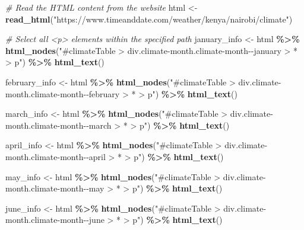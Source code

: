 \documentclass[
]{article}
\newenvironment{Shaded}{\begin{snugshade}}{\end{snugshade}}
\newcommand{\CommentTok}[1]{\textcolor[rgb]{0.56,0.35,0.01}{\textit{#1}}}
\newcommand{\FunctionTok}[1]{\textcolor[rgb]{0.13,0.29,0.53}{\textbf{#1}}}
\newcommand{\NormalTok}[1]{#1}
\newcommand{\OtherTok}[1]{\textcolor[rgb]{0.56,0.35,0.01}{#1}}
\newcommand{\SpecialCharTok}[1]{\textcolor[rgb]{0.81,0.36,0.00}{\textbf{#1}}}
\newcommand{\StringTok}[1]{\textcolor[rgb]{0.31,0.60,0.02}{#1}}
\begin{document}
\begin{Shaded}
\begin{Highlighting}[]
\CommentTok{\# Read the HTML content from the website}
\NormalTok{html }\OtherTok{\textless{}{-}} \FunctionTok{read\_html}\NormalTok{(}\StringTok{"https://www.timeanddate.com/weather/kenya/nairobi/climate"}\NormalTok{)}

\CommentTok{\# Select all \textless{}p\textgreater{} elements within the specified path}
\NormalTok{january\_info }\OtherTok{\textless{}{-}}\NormalTok{ html }\SpecialCharTok{\%\textgreater{}\%}
  \FunctionTok{html\_nodes}\NormalTok{(}\StringTok{"\#climateTable \textgreater{} div.climate{-}month.climate{-}month{-}{-}january \textgreater{} * \textgreater{} p"}\NormalTok{) }\SpecialCharTok{\%\textgreater{}\%}
  \FunctionTok{html\_text}\NormalTok{()}

\NormalTok{february\_info }\OtherTok{\textless{}{-}}\NormalTok{ html }\SpecialCharTok{\%\textgreater{}\%}
  \FunctionTok{html\_nodes}\NormalTok{(}\StringTok{"\#climateTable \textgreater{} div.climate{-}month.climate{-}month{-}{-}february \textgreater{} * \textgreater{} p"}\NormalTok{) }\SpecialCharTok{\%\textgreater{}\%}
  \FunctionTok{html\_text}\NormalTok{()}

\NormalTok{march\_info }\OtherTok{\textless{}{-}}\NormalTok{ html }\SpecialCharTok{\%\textgreater{}\%}
  \FunctionTok{html\_nodes}\NormalTok{(}\StringTok{"\#climateTable \textgreater{} div.climate{-}month.climate{-}month{-}{-}march \textgreater{} * \textgreater{} p"}\NormalTok{) }\SpecialCharTok{\%\textgreater{}\%}
  \FunctionTok{html\_text}\NormalTok{()}

\NormalTok{april\_info }\OtherTok{\textless{}{-}}\NormalTok{ html }\SpecialCharTok{\%\textgreater{}\%}
  \FunctionTok{html\_nodes}\NormalTok{(}\StringTok{"\#climateTable \textgreater{} div.climate{-}month.climate{-}month{-}{-}april \textgreater{} * \textgreater{} p"}\NormalTok{) }\SpecialCharTok{\%\textgreater{}\%}
  \FunctionTok{html\_text}\NormalTok{()}

\NormalTok{may\_info }\OtherTok{\textless{}{-}}\NormalTok{ html }\SpecialCharTok{\%\textgreater{}\%}
  \FunctionTok{html\_nodes}\NormalTok{(}\StringTok{"\#climateTable \textgreater{} div.climate{-}month.climate{-}month{-}{-}may \textgreater{} * \textgreater{} p"}\NormalTok{) }\SpecialCharTok{\%\textgreater{}\%}
  \FunctionTok{html\_text}\NormalTok{()}

\NormalTok{june\_info }\OtherTok{\textless{}{-}}\NormalTok{ html }\SpecialCharTok{\%\textgreater{}\%}
  \FunctionTok{html\_nodes}\NormalTok{(}\StringTok{"\#climateTable \textgreater{} div.climate{-}month.climate{-}month{-}{-}june \textgreater{} * \textgreater{} p"}\NormalTok{) }\SpecialCharTok{\%\textgreater{}\%}
  \FunctionTok{html\_text}\NormalTok{()}


\end{Highlighting}
\end{Shaded}
\end{document}

